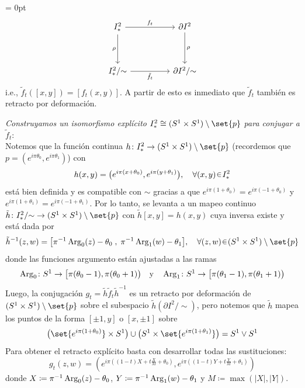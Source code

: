 \begin{sol}
{\mathsurround = 0pt
\[\begin{tikzcd}%
	{I^2_*} && {\partial I^2} \\
	\\
	{I^2_*/{\sim}} && {\partial I^2/{\sim}}
	\arrow["{f_t}", from=1-1, to=1-3]
	\arrow["\rho"', from=1-1, to=3-1]
	\arrow["\rho", from=1-3, to=3-3]
	\arrow["{\tilde{f}_t}"', from=3-1, to=3-3]
\end{tikzcd}\]
}
i.e., $\tilde{f}_t([x,y]) = [f_t(x,y)]$. A partir de esto es inmediato que $\tilde{f}_t$ también es retracto por deformación.\par\vspace{1em}
\emph{Construyamos un isomorfismo explícito $I^2_* \cong (S^1 \times S^1)\setminus\set{p}$ para conjugar a $\tilde{f}_t$}:\\
Notemos que la función continua $h \colon I^2_* \to (S^1 \times S^1)\setminus\set{p}$ (recordemos que $p = (e^{i\pi\theta_0}, e^{i\pi\theta_1})$) con
\[
h(x,y) = \big(%
    e^{i\pi(x + \theta_0)} , e^{i\pi(y + \theta_1)}
\big),%
\quad\forall(x,y) \en I^2_*
\]
está bien definida y es compatible con $\sim$ gracias a que $e^{i\pi(1+\theta_0)} = e^{i\pi(-1+\theta_0)}$ y $e^{i\pi(1+\theta_1)} = e^{i\pi(-1+\theta_1)}$. Por lo tanto, se levanta a un mapeo continuo $\tilde{h} \colon I^2_*/{\sim} \to (S^1 \times S^1)\setminus\set{p}$ con $\tilde{h}[x,y] = h(x,y)$ cuya inversa existe y está dada por
\[
\tilde{h}^{-1}(z,w) = \big[%
\pi^{-1}\Arg_0(z) - \theta_0 \;,\; \pi^{-1}\Arg_1(w) - \theta_1
\big],%
\quad\forall(z,w) \en (S^1 \times S^1)\setminus\set{p}
\]
donde las funciones argumento están ajustadas a las ramas 
\[
\Arg_0 \colon S^1 \to \big[\pi(\theta_0 - 1), \pi(\theta_0 + 1)\big)%
\quad\text{y}\quad%
\Arg_1 \colon S^1 \to \big[\pi(\theta_1 - 1), \pi(\theta_1 + 1)\big)%
\]
Luego, la conjugación $g_t = \tilde{h}\tilde{f}_t\tilde{h}^{-1}$ es un retracto por deformación de $(S^1 \times S^1)\setminus\set{p}$ sobre el subespacio $\tilde{h}(\partial I^2/{\sim})$, pero notemos que $\tilde{h}$ mapea los puntos de la forma $[\pm1,y]$ o $[x,\pm1]$ sobre
\[
\big( \set{e^{i\pi(1+\theta_0)}} \times S^1 \big)%
\cup%
\big( S^1 \times \set{e^{i\pi(1+\theta_1)}} \big)%
= S^1 \lor S^1
\]
Para obtener el retracto explícito basta con desarrollar todas las sustituciones:
\[
g_t(z,w) = \left(
e^{i\pi\left((1-t)X + t\frac{X}{M} + \theta_0\right)},
e^{i\pi\left((1-t)Y + t\frac{Y}{M} + \theta_1\right)}
\right)
\]
donde $X \coloneq \pi^{-1}\operatorname{Arg}_0(z) - \theta_0$, $Y \coloneq \pi^{-1}\operatorname{Arg}_1(w) - \theta_1$ y $M \coloneq \max(|X|, |Y|)$.
\end{sol}

